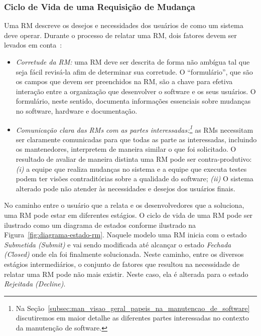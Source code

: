 \subsubsection{Ciclo de Vida de uma Requisição de Mudança}
\label{sub:fluxo_de_trabalho_requisicao_mudanca}

Uma RM descreve os desejos e necessidades dos usuários de como um sistema deve
operar. Durante o processo de relatar uma RM, dois fatores devem ser levados em
conta~\cite{tripathy2014software}:

\begin{itemize}
	\item \textit{Corretude da RM:} uma RM deve ser descrita de forma não
		ambígua tal que seja fácil revisá-la afim de determinar sua corretude. O
		``formulário'', que são os campos que devem ser preenchidos na RM, são a
		chave para efetiva interação entre a organização que desenvolver o
		software e os seus usuários. O formulário, neste sentido, documenta
		informações essenciais sobre mudanças no software, hardware e
		documentação.
   \item \textit{Comunicação clara das RMs com as partes
		   interessadas:\footnote{Na
			   Seção~\ref{subsec:man_visao_geral_papeis_na_manutencao_de_software}
			   discutiremos em maior detalhe as diferentes partes interessadas
			   no contexto da manutenção de software.}} as RMs necessitam ser
	   claramente comunicadas para que todas as parte as interessadas, incluindo
	   os mantenedores, interpretem de maneira similar o que foi solicitado. O
	   resultado de avaliar de maneira distinta uma RM pode ser
	   contra-produtivo: \textit{(i)} a equipe que realiza mudanças no sistema e
	   a equipe que executa testes podem ter  visões contraditórias sobre a
	   qualidade do software; \textit{(ii)} O sistema alterado pode não atender
	   às necessidades e desejos dos usuários finais.
\end{itemize}

No caminho entre o usuário que a relata e os desenvolvedores que a soluciona,
uma RM pode estar em diferentes estágios. O ciclo de vida de uma RM pode ser
ilustrado como um diagrama de estados conforme ilustrado na
Figura~\ref{fig:diagrama-estado-rm}. Naquele modelo uma RM inicia com o estado
\textit{Submetida (Submit)} e vai sendo modificada até alcançar o estado
\textit{Fechada (Closed)} onde ela foi finalmente solucionada. Neste caminho,
entre os diversos estágios intermediários, o conjunto de fatores que resultou na
necessidade de relatar uma RM pode não mais existir. Neste caso, ela é alterada
para o estado \textit{Rejeitada (Decline)}.


